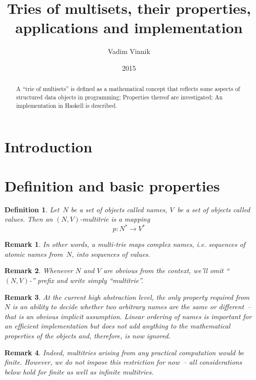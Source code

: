 \documentclass{article}
\title{Tries of multisets, their properties, applications and implementation}
\author{Vadim Vinnik}
\date{2015}
\newtheorem{Df}{Definition}
\newtheorem{Rm}{Remark}
\begin{document}
\maketitle

\begin{abstract}
A ``trie of multisets'' is defined as a mathematical concept that
reflects some aspects of structured data objects in programming;
Properties thereof are investigated; An implementation in Haskell
is described.
\end{abstract}

\tableofcontents

\section{Introduction}

\section{Definition and basic properties}

\begin{Df}
Let~$N$ be a set of objects called \emph{names}, $V$~be a set of objects called
\emph{values}. Then an \emph{$(N,V)$-multitrie} is a mapping
\[
  p : N^* \to V^*
\]
\end{Df}

\begin{Rm}
In other words, a multi-trie maps complex names, i.e. sequences of
atomic names from~$N$, into sequences of values.
\end{Rm}

\begin{Rm}
Whenever $N$ and $V$ are obvious from the context, we'll omit ``$(N,V)$-''
prefix and write simply ``multitrie''.
\end{Rm}

\begin{Rm}
At the current high abstraction level, the only property required from~$N$
is an ability to decide whether two arbitrary names are the same or
different~-- that is an obvious implicit assumption. Linear ordering of
names is important for an efficient implementation but does not add anything
to the mathematical properties of the objects and, therefore, is now
ignored.
\end{Rm}

\begin{Rm}
Indeed, multitries arising from any practical computation would be finite.
However, we do not impose this restriction for now~-- all considerations
below hold for finite as well as infinite multitries.
\end{Rm}
\end{document}
